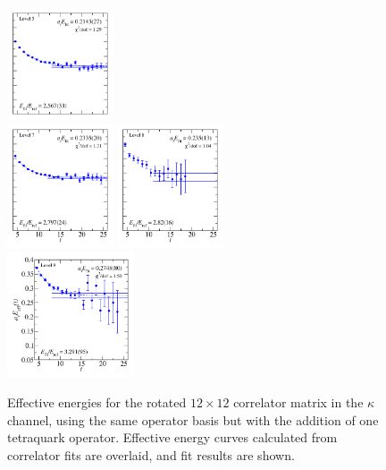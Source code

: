 \begin{figure}
  \includegraphics[width=0.28\textwidth]{figures/spectrum_a1g/with_tq/fits/fit_5.pdf}\\
  \includegraphics[width=0.28\textwidth]{figures/spectrum_a1g/with_tq/fits/fit_6.pdf}
  \includegraphics[width=0.28\textwidth]{figures/spectrum_a1g/with_tq/fits/fit_7.pdf}\\[-0.4cm]
  \includegraphics[width=0.336\textwidth]{figures/spectrum_a1g/with_tq/fits/fit_9.pdf}
  \caption{Effective energies for the rotated $12\times 12$ correlator matrix in the $\kappa$ channel, using the same operator basis but with the addition of one tetraquark operator. Effective energy curves calculated from correlator fits are overlaid, and fit results are shown.}
  \label{fig:kappa_with_tq_grid}
\end{figure}

